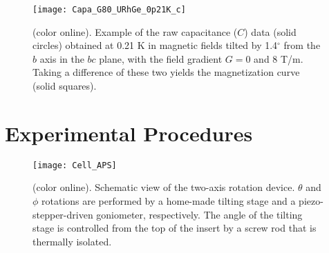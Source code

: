 \documentclass[twocolumn, aps, superscriptaddress, amsfonts,floatfix]{revtex4}%
\begin{document}

\begin{figure}[t]
\begin{center}
\texttt{[image: Capa\_G80\_URhGe\_0p21K\_c]}
\caption{ 
(color online). Example of the raw capacitance ($C$) data (solid circles) obtained at 0.21 K in magnetic fields tilted by 1.4$^\circ$  from  the $b$ axis in the $bc$ plane, with the field gradient $G = 0$ and 8  T/m. Taking a difference of these two yields the magnetization curve   (solid squares).
\label{Capa_G80_URhGe_0p2K_c}}
\end{center}
\end{figure}

\section{Experimental Procedures}
\begin{figure}[t]
\begin{center}
\texttt{[image: Cell\_APS]}
\caption{ 
(color online). Schematic view of the two-axis rotation  device. $\theta$ and $\phi$ rotations are performed by a home-made tilting stage and  a piezo-stepper-driven goniometer, respectively. The angle of the tilting stage is controlled from the top of the insert by a screw rod that is thermally isolated.
\label{Cell_APS}}
\end{center}
\end{figure}
\end{document}
